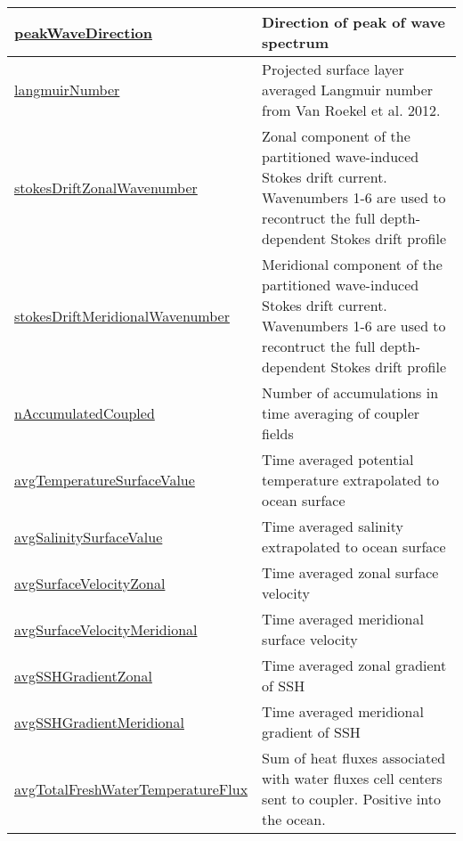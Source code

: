 {\begin{center}
\begin{longtable}{| p{2.0in} | p{4.0in} |}
    \hline
    \hyperref[subsec:var_sec_forcing_peakWaveDirection]{peakWaveDirection} & Direction of peak of wave spectrum \\
    \hline
    \hyperref[subsec:var_sec_forcing_langmuirNumber]{langmuirNumber} & Projected surface layer averaged Langmuir number from Van Roekel et al. 2012. \\
    \hline
    \hyperref[subsec:var_sec_forcing_stokesDriftZonalWavenumber]{stokesDriftZonalWavenumber} & Zonal component of the partitioned wave-induced Stokes drift current. Wavenumbers 1-6 are used to recontruct the full depth-dependent Stokes drift profile \\
    \hline
    \hyperref[subsec:var_sec_forcing_stokesDriftMeridionalWavenumber]{stokesDriftMeridional\-Wavenumber} & Meridional component of the partitioned wave-induced Stokes drift current. Wavenumbers 1-6 are used to recontruct the full depth-dependent Stokes drift profile \\
    \hline
    \hyperref[subsec:var_sec_forcing_nAccumulatedCoupled]{nAccumulatedCoupled} & Number of accumulations in time averaging of coupler fields \\
    \hline
    \hyperref[subsec:var_sec_forcing_avgTemperatureSurfaceValue]{avgTemperatureSurfaceValue} & Time averaged potential temperature extrapolated to ocean surface \\
    \hline
    \hyperref[subsec:var_sec_forcing_avgSalinitySurfaceValue]{avgSalinitySurfaceValue} & Time averaged salinity extrapolated to ocean surface \\
    \hline
    \hyperref[subsec:var_sec_forcing_avgSurfaceVelocityZonal]{avgSurfaceVelocityZonal} & Time averaged zonal surface velocity \\
    \hline
    \hyperref[subsec:var_sec_forcing_avgSurfaceVelocityMeridional]{avgSurfaceVelocityMeridional} & Time averaged meridional surface velocity \\
    \hline
    \hyperref[subsec:var_sec_forcing_avgSSHGradientZonal]{avgSSHGradientZonal} & Time averaged zonal gradient of SSH \\
    \hline
    \hyperref[subsec:var_sec_forcing_avgSSHGradientMeridional]{avgSSHGradientMeridional} & Time averaged meridional gradient of SSH \\
    \hline
    \hyperref[subsec:var_sec_forcing_avgTotalFreshWaterTemperatureFlux]{avgTotalFreshWaterTemperature\-Flux} & Sum of heat fluxes associated with water fluxes cell centers sent to coupler. Positive into the ocean. \\

\end{longtable}
\end{center}}
